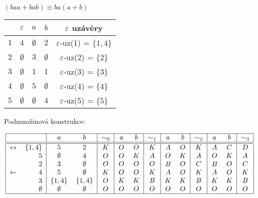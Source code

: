 \begin{multicols}{2}

    $(baa + bab) \equiv ba(a+b)$


\columnbreak

    \begin{tabular}{|r|c c c|c|}
        \hline
        & $\varepsilon$ & $a$ & $b$ & $\varepsilon$ uzávěry\\
        \hline
        \hline
        $1$ & $4$ & $\emptyset$ & $2$         & $\varepsilon$-uz(1) = $\{1,4\}$\\
        $2$ & $\emptyset$ & $3$ & $\emptyset$ & $\varepsilon$-uz(2) = $\{2\}$\\
        $3$ & $\emptyset$ & $1$ & $1$         & $\varepsilon$-uz(3) = $\{3\}$\\
        $4$ & $\emptyset$ & $5$ & $\emptyset$ & $\varepsilon$-uz(4) = $\{4\}$\\
        $5$ & $\emptyset$ & $\emptyset$ & $4$ & $\varepsilon$-uz(5) = $\{5\}$\\
        \hline
    \end{tabular}
\end{multicols}

Podmnožinová konstrukce:

\[
\begin{tabular}{|r r|c c|c|c c|c|c c|c|c c|c|}
    \hline
    & & $a$ & $b$ & $\sim_0$ & $a$ & $b$ & $\sim_1$ & $a$ & $b$ & $\sim_2$ & $a$ & $b$ & $\sim_3$\\
    \hline
    \hline
    $\leftrightarrow$& $\{1,4\}$ &$5$         &$2$         &$K$ &$O$ &$O$ &$K$ &$A$ &$O$ &$K$ &$A$ &$C$ &$D$\\
    $$&             $5$          &$\emptyset$ &$4$         &$O$ &$O$ &$K$ &$A$ &$O$ &$K$ &$A$ &$O$ &$K$ &$A$\\
    $$&             $2$          &$3$         &$\emptyset$ &$O$ &$O$ &$O$ &$O$ &$B$ &$O$ &$C$ &$B$ &$O$ &$C$\\
    $\leftarrow $&  $4$          &$5$         &$\emptyset$ &$K$ &$O$ &$O$ &$K$ &$A$ &$O$ &$K$ &$A$ &$O$ &$K$\\
    $$&             $3$          &$\{1,4\}$   &$\{1,4\}$   &$O$ &$K$ &$K$ &$B$ &$K$ &$K$ &$B$ &$K$ &$K$ &$B$\\
    $$&             $\emptyset$  &$\emptyset$ &$\emptyset$ &$O$ &$O$ &$O$ &$O$ &$O$ &$O$ &$O$ &$O$ &$O$ &$O$\\
    \hline
\end{tabular}
\]

